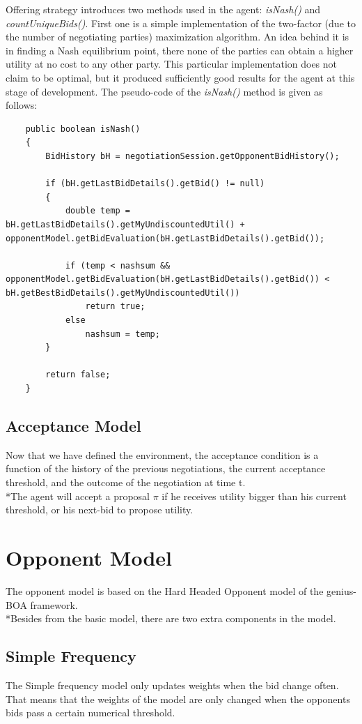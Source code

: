 \documentclass[html]{report}    %
\begin{document}
Offering strategy introduces two methods used in the agent: \textit{isNash()} and \textit{countUniqueBids()}. First one is a simple implementation of the two-factor (due to the number of negotiating parties) maximization algorithm. An idea behind it is in finding a Nash equilibrium point, there none of the parties can obtain a higher utility at no cost to any other party. This particular implementation does not claim to be optimal, but it produced sufficiently good results for the agent at this stage of development. The pseudo-code of the  \textit{isNash()} method is given as follows:

\begin{verbatim}
	public boolean isNash()
	{
		BidHistory bH = negotiationSession.getOpponentBidHistory();
		
		if (bH.getLastBidDetails().getBid() != null)
		{
			double temp = bH.getLastBidDetails().getMyUndiscountedUtil() + opponentModel.getBidEvaluation(bH.getLastBidDetails().getBid());
			
			if (temp < nashsum && opponentModel.getBidEvaluation(bH.getLastBidDetails().getBid()) < bH.getBestBidDetails().getMyUndiscountedUtil())
				return true;
			else
				nashsum = temp;
		}
		
		return false;
	}
\end{verbatim}

\subsection{Acceptance Model}

Now that we have defined the environment, the acceptance condition is a function of the history of the previous negotiations, the current acceptance threshold, and the outcome of the negotiation at time t.
\\*The agent will accept a proposal $\pi$ if he receives utility bigger than his current threshold, or his next-bid to propose utility.


\section{Opponent Model}  

The opponent model is based on the Hard Headed Opponent model of the genius-BOA framework.
\\*Besides from the basic model, there are two extra components in the model.~\cite{anac2013}
\subsection{Simple Frequency}
The Simple frequency model only updates weights when the bid change often.
That means that the weights of the model are only changed when the opponents bids pass a certain numerical threshold.
\end{document}
